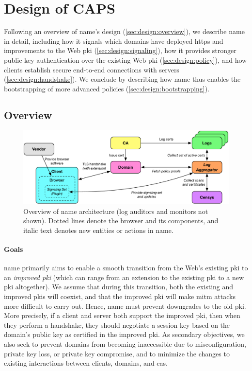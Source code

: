 \section{Design of CAPS}
\label{sec:design}

Following an overview of \ac{name}'s design (\autoref{sec:design:overview}), we
describe \ac{name} in detail, including how it signals which domains have
deployed \ac{https} and improvements to the Web \ac{pki}
(\autoref{sec:design:signaling}), how it provides stronger public-key
authentication over the existing Web \ac{pki} (\autoref{sec:design:policy}), and
how clients establish secure end-to-end connections with servers
(\autoref{sec:design:handshake}). We conclude by describing how \ac{name} thus
enables the bootstrapping of more advanced policies
(\autoref{sec:design:bootstrapping}).

\subsection{Overview}
\label{sec:design:overview}

\begin{figure}
  \centering
  \includegraphics[width=0.8\linewidth]{fig/overview2}
  \caption{Overview of \ac{name} architecture (log auditors and monitors not
  shown). Dotted lines denote the browser and its components, and italic text
denotes new entities or actions in \ac{name}.}
  \label{fig:overview}
\end{figure}

\paragraph{Goals}

\ac{name} primarily aims to enable a smooth transition from the Web's existing
\ac{pki} to an \emph{improved \ac{pki}} (which can range from an extension to
the existing \ac{pki} to a new \ac{pki} altogether). We assume that during this
transition, both the existing and improved \acp{pki} will coexist, and that the
improved \ac{pki} will make \ac{mitm} attacks more difficult to carry out.
Hence, \ac{name} must prevent downgrades to the old \ac{pki}. More precisely, if
a client and server both support the improved \ac{pki}, then when they perform a
handshake, they should negotiate a session key based on the domain's public key
as certified in the improved \ac{pki}. As secondary objectives, we also seek to
prevent domains from becoming inaccessible due to misconfiguration, private key
loss, or private key compromise, and to minimize the changes to existing
interactions between clients, domains, and \acp{ca}.

